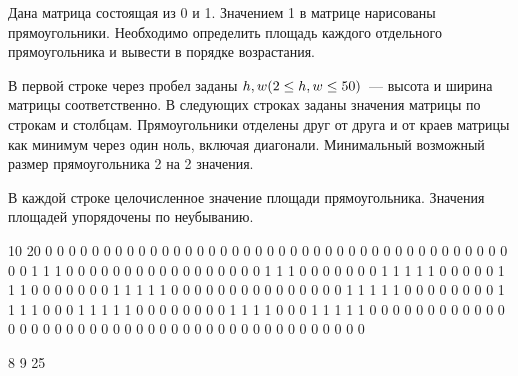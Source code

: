 
Дана матрица состоящая из 0 и 1. Значением 1 в матрице нарисованы прямоугольники. Необходимо определить площадь каждого отдельного прямоугольника и вывести в порядке возрастания.


В первой строке через пробел заданы $h, w \space (2 \leq h, w \leq 50)$ — высота и ширина матрицы соответственно. В следующих строках заданы значения матрицы по строкам и столбцам. Прямоугольники отделены друг от друга и от краев матрицы как минимум через один ноль, включая диагонали. Минимальный возможный размер прямоугольника 2 на 2 значения.

\outputfmtSection

В каждой строке целочисленное значение площади прямоугольника. Значения площадей упорядочены по неубыванию.


\begin{myverbbox}[\small]{\vinput}
    10 20
    0 0 0 0 0 0 0 0 0 0 0 0 0 0 0 0 0 0 0 0
    0 0 0 0 0 0 0 0 0 0 0 0 0 0 0 0 0 0 0 0
    0 0 1 1 1 0 0 0 0 0 0 0 0 0 0 0 0 0 0 0
    0 0 1 1 1 0 0 0 0 0 0 0 1 1 1 1 1 0 0 0
    0 0 1 1 1 0 0 0 0 0 0 0 1 1 1 1 1 0 0 0
    0 0 0 0 0 0 0 0 0 0 0 0 1 1 1 1 1 0 0 0
    0 0 0 0 0 1 1 1 1 0 0 0 1 1 1 1 1 0 0 0
    0 0 0 0 0 1 1 1 1 0 0 0 1 1 1 1 1 0 0 0
    0 0 0 0 0 0 0 0 0 0 0 0 0 0 0 0 0 0 0 0
    0 0 0 0 0 0 0 0 0 0 0 0 0 0 0 0 0 0 0 0
\end{myverbbox}
\begin{myverbbox}[\small]{\voutput}
    8
    9
    25
\end{myverbbox}

